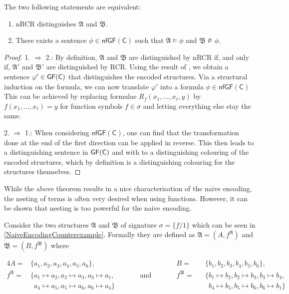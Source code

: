 \begin{theorem}
	The two following statements are equivalent:
	\begin{enumerate}
		\item nRCR distinguishes $\mathfrak A$ and $\mathfrak B$.
		\item There exists a sentence $\phi\in \mathsf{nfGF}(\mathsf C)$ such that $\mathfrak A\models \phi$ and $\mathfrak B\not\models \phi$.
	\end{enumerate}
\end{theorem}
\begin{proof}
	1. $\Rightarrow$ 2.:
	By definition, $\mathfrak A$ and $\mathfrak B$ are distinguished by nRCR if, and only if, $\mathfrak A'$ and $\mathfrak B'$ are distinguished by RCR.
	Using the result of \cite{scheidt2025ColorRefinement}, we obtain a sentence $\varphi'\in\mathsf{GF}(\mathsf{C})$ that distinguishes the encoded structures.
	Via a structural induction on the formula, we can now translate $\varphi'$ into a formula $\phi\in \mathsf{nfGF}(\mathsf C)$
	This can be achieved by replacing formulae $R_f(x_1,\dots,x_\ell,y)$ by $f(x_1,\dots,x_\ell)=y$ for function symbols $f\in\sigma$ and letting everything else stay the same.
	
	2. $\Rightarrow$ 1.:
	When considering $\mathsf{nfGF}(\mathsf C)$, one can find that the transformation done at the end of the first direction can be applied in reverse.
	This then leads to a distinguishing sentence in $\mathsf{GF}(\mathsf{C})$ and with \cite{scheidt2025ColorRefinement} to a distinguishing colouring of the encoded structures, which by definition is a distinguishing colouring for the structures themselves.
\end{proof}

While the above theorem results in a nice characterisation of the naive encoding, the nesting of terms is often very desired when using functions.
However, it can be shown that nesting is too powerful for the naive encoding.

Consider the two structures $\mathfrak A$ and $\mathfrak B$ of signature $\sigma=\{f/1\}$ which can be seen in \cref{NaiveEncodingCounterexample}.
Formally they are defined as $\mathfrak A=(A,f^{\mathfrak A})$ and $\mathfrak B = (B, f^{\mathfrak B})$ where

\begin{alignat*}{4}
	A=&\{a_1,a_2,a_3,a_4,a_5,a_6\}, &&  && B=&&\{b_1,b_2,b_3,b_4,b_5,b_6\},\\
	f^{\mathfrak A}=&\{a_1\mapsto a_2, a_2\mapsto a_3, a_3 \mapsto a_1, && \qquad \text{and} \qquad && f^{\mathfrak B}=&&\{b_1 \mapsto b_2, b_2 \mapsto b_3, b_3 \mapsto b_4, \\
	&\phantom{\{} a_4\mapsto a_5, a_5\mapsto a_6, a_6\mapsto a_4 \} &&  && && \phantom{\{} b_4 \mapsto b_5, b_5 \mapsto b_6, b_6 \mapsto b_1\}
\end{alignat*}

